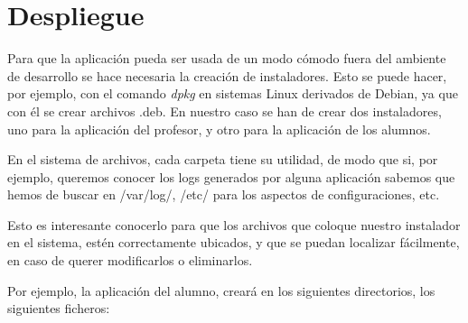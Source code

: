 
\label{chap:despliegue}

\chaptertoc

\section{Despliegue}
\label{sec:despliegue:despliegue}

Para que la aplicación pueda ser usada de un modo cómodo fuera del ambiente de desarrollo se hace necesaria la creación de instaladores. Esto se puede hacer, por ejemplo, con el comando \emph{dpkg} en sistemas Linux derivados de Debian\cite{DEBIAN:2005}, ya que con él se crear archivos .deb. En nuestro caso se han de crear dos instaladores, uno para la aplicación del profesor, y otro para la aplicación de los alumnos.
\newline

En el sistema de archivos, cada carpeta tiene su utilidad, de modo que si, por ejemplo, queremos conocer los logs generados por alguna aplicación sabemos que hemos de buscar en /var/log/, /etc/ para los aspectos de configuraciones, etc.
\newline

Esto es interesante conocerlo para que los archivos que coloque nuestro instalador en el sistema, estén correctamente ubicados, y que se puedan localizar fácilmente, en caso de querer modificarlos o eliminarlos.
\newline

Por ejemplo, la aplicación del alumno, creará en los siguientes directorios, los siguientes ficheros:

